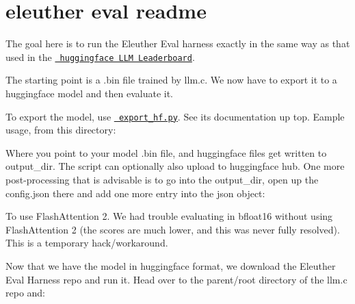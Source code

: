 \chapter{eleuther eval readme}
\hypertarget{md_dev_2eval_2README}{}\label{md_dev_2eval_2README}
\label{md_dev_2eval_2README_autotoc_md41}%
%


The goal here is to run the Eleuther Eval harness exactly in the same way as that used in the \href{https://huggingface.co/spaces/open-llm-leaderboard/open_llm_leaderboard}{\texttt{ huggingface LLM Leaderboard}}.

The starting point is a {\ttfamily .bin} file trained by llm.\+c. We now have to export it to a huggingface model and then evaluate it.

To export the model, use \href{export_hf.py}{\texttt{ export\+\_\+hf.\+py}}. See its documentation up top. Eample usage, from this directory\+:


\begin{DoxyCode}{0}

\end{DoxyCode}


Where you point to your model .bin file, and huggingface files get written to output\+\_\+dir. The script can optionally also upload to huggingface hub. One more post-\/processing that is advisable is to go into the {\ttfamily output\+\_\+dir}, open up the {\ttfamily config.\+json} there and add one more entry into the json object\+:


\begin{DoxyCode}{0}

\end{DoxyCode}


To use Flash\+Attention 2. We had trouble evaluating in bfloat16 without using Flash\+Attention 2 (the scores are much lower, and this was never fully resolved). This is a temporary hack/workaround.

Now that we have the model in huggingface format, we download the Eleuther Eval Harness repo and run it. Head over to the parent/root directory of the llm.\+c repo and\+:


\begin{DoxyCode}{0}

\end{DoxyCode}


